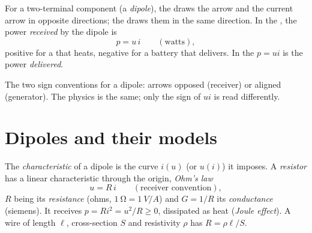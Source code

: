 \begin{notation}\label{not:b1:dc-circuits:conventions}
For a two-terminal component (a \emph{dipole}), the \emph{} draws the  arrow and the current arrow in opposite
directions; the \emph{} draws them in the same
direction. In the , the power \emph{received} by the
dipole is
\[
p = u\,i \qquad (\text{watts}),
\]
positive for a  that heats, negative for a battery that
delivers. In the  $p = ui$ is the power
\emph{delivered}.
\end{notation}

\begin{omfigure}

{\small The two sign conventions for a dipole: arrows opposed
(receiver) or aligned (generator). The physics is the same; only the
sign of $ui$ is read differently.}
\end{omfigure}

\section{Dipoles and their models}

\begin{definition}\label{def:b1:dc-circuits:resistor}
The \emph{characteristic} of a dipole is the curve $i(u)$ (or $u(i)$)
it imposes. A \emph{resistor} has a linear characteristic through the
origin, \emph{Ohm's law}
\[
u = R\,i \qquad (\text{receiver convention}),
\]
$R$ being its \emph{resistance} (ohms, $\qty{1}{\ohm} = \qty{1}{V/A}$) and
$G = 1/R$ its \emph{conductance} (siemens). It receives $p = Ri^2 =
u^2/R \geq 0$, dissipated as heat (\emph{Joule effect}). A wire of
length $\ell$, cross-section $S$ and resistivity $\rho$ has
$R = \rho\ell/S$.
\end{definition}

